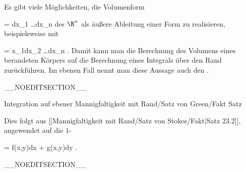 Es gibt viele Möglichkeiten, die Volumenform

\mavergleichskette
{\vergleichskette
{ \tau
}
{ = }{ dx_1 \wedge \ldots \wedge dx_n
}
{  }{
}
{    }{
}
{   }{
}
}
{}{}{}
des $\R^n$ als äußere Ableitung einer
Form zu realisieren, beispielsweise mit

\mavergleichskette
{\vergleichskette
{  \omega
}
{ = }{ x_1dx_2 \wedge \ldots \wedge dx_n
}
{  }{
}
{    }{
}
{   }{
}
}
{}{}{.}
Damit kann man die Berechnung des Volumens eines berandeten Körpers auf die Berechnung eines Integrals über den Rand zurückführen. Im ebenen Fall nennt man diese Aussage auch den  {.}

__NOEDITSECTION__

{Integration auf ebener Mannigfaltigkeit mit Rand/Satz von Green/Fakt}
{Satz}
{}
{

\faktzusatz {}
\faktzusatz {}

}
{

Dies folgt aus
[[Mannigfaltigkeit mit Rand/Satz von Stokes/Fakt|Satz 23.2]],
angewendet auf die
$1$-

\mavergleichskette
{\vergleichskette
{ \omega
}
{ = }{ f(x,y)dx + g(x,y)dy
}
{  }{
}
{    }{
}
{   }{
}
}
{}{}{.}

}

__NOEDITSECTION__

